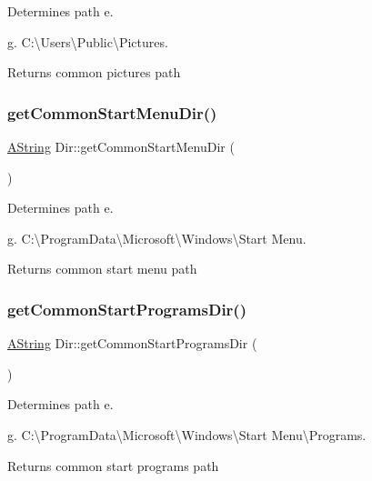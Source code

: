 Determines path e. 

g. C\+:\textbackslash{}\+Users\textbackslash{}\+Public\textbackslash{}\+Pictures. \begin{DoxyReturn}{Returns}
common pictures path 
\end{DoxyReturn}
\mbox{\label{class_dir_abd4058868877e67fad5b73b0998baaba}} 
\subsubsection{\texorpdfstring{getCommonStartMenuDir()}{getCommonStartMenuDir()}}
{\footnotesize\ttfamily \mbox{\hyperlink{class_a_string}{A\+String}} Dir\+::get\+Common\+Start\+Menu\+Dir (\begin{DoxyParamCaption}{ }\end{DoxyParamCaption})\hspace{0.3cm}{\ttfamily [static]}}



Determines path e. 

g. C\+:\textbackslash{}\+Program\+Data\textbackslash{}\+Microsoft\textbackslash{}\+Windows\textbackslash{}\+Start Menu. \begin{DoxyReturn}{Returns}
common start menu path 
\end{DoxyReturn}
\mbox{\label{class_dir_a45ed388bd2ce68516bd24f12a8342b00}} 
\subsubsection{\texorpdfstring{getCommonStartProgramsDir()}{getCommonStartProgramsDir()}}
{\footnotesize\ttfamily \mbox{\hyperlink{class_a_string}{A\+String}} Dir\+::get\+Common\+Start\+Programs\+Dir (\begin{DoxyParamCaption}{ }\end{DoxyParamCaption})\hspace{0.3cm}{\ttfamily [static]}}



Determines path e. 

g. C\+:\textbackslash{}\+Program\+Data\textbackslash{}\+Microsoft\textbackslash{}\+Windows\textbackslash{}\+Start Menu\textbackslash{}\+Programs. \begin{DoxyReturn}{Returns}
common start programs path 
\end{DoxyReturn}
\mbox{\label{class_dir_aebe4af5ea17098d78b367b090877ccc3}} 
